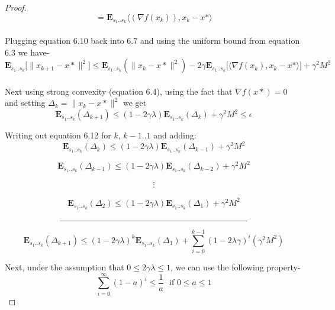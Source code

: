 \documentclass[12pt]{report}
\begin{document}
\begin{proof}
\begin{equation}
 = \mathbf{E}_{s_{1}..s_{k}}\langle (\nabla f(x_{k})),x_{k}-x*\rangle
\end{equation}
\\
Plugging equation $6.10$ back into $6.7$ and using the uniform bound from equation $6.3$ we have-
\begin{equation}
\mathbf{E}_{s_{1}..s_{k}}\lbrack\|x_{k+1}-x*\|^{2}\rbrack \leq \mathbf{E}_{s_{1}..s_{k}}(\|x_{k}-x*\|^{2})- 2\gamma \mathbf{E}_{s_{1}..s_{k}}\lbrack\langle \nabla f(x_{k}), x_{k}-x*\rangle\rbrack + \gamma^{2}M^{2}
\end{equation}
\\
Next using strong convexity (equation 6.4), using the fact that $\nabla f(x*) =0$ and setting $\Delta_{k} = \|x_{k}-x*\|^2$ we get
\begin{equation}
\mathbf{E}_{s_{1}..s_{k}}(\Delta_{k+1}) \leq (1-2\gamma\lambda)\mathbf{E}_{s_{1}..s_{k}}(\Delta_{k}) + \gamma^2 M^2 \leq \epsilon
\end{equation}

Writing out equation 6.12 for $k$, $k-1$..$1$ and adding:
\begin{equation}
\mathbf{E}_{s_{1}..s_{k}}(\Delta_{k}) \leq (1-2\gamma\lambda)\mathbf{E}_{s_{1}..s_{k}}(\Delta_{k-1}) + \gamma^2 M^2 
\end{equation}

\begin{equation}
\mathbf{E}_{s_{1}..s_{k}}(\Delta_{k-1}) \leq (1-2\gamma\lambda)\mathbf{E}_{s_{1}..s_{k}}(\Delta_{k-2}) + \gamma^2 M^2 
\end{equation}


\begin{align*}
\vdots
\end{align*}

\begin{equation}
\mathbf{E}_{s_{1}..s_{k}}(\Delta_{2}) \leq (1-2\gamma\lambda)\mathbf{E}_{s_{1}..s_{k}}(\Delta_{1}) + \gamma^2 M^2 
\end{equation}
\begin{align*}
\rule{8cm}{0.4pt}
\end{align*}
\begin{equation}
\mathbf{E}_{s_{1}..s_{k}}(\Delta_{k+1}) \leq (1-2\gamma\lambda)^{k}\mathbf{E}_{s_{1}..s_{k}}(\Delta_{1}) +  \sum_{i=0}^{k-1}(1-2\lambda\gamma)^i(\gamma^2M^2)
\end{equation}

Next, under the assumption that $0\leq 2\gamma\lambda \leq 1$, we can use the following property-
\begin{equation}
\sum_{i=0}^{\infty}(1-a)^i \leq \frac{1}{a} \,\,\,\,\text{if}\,\, 0\leq a \leq 1
\end{equation}


\end{proof}
\end{document}
